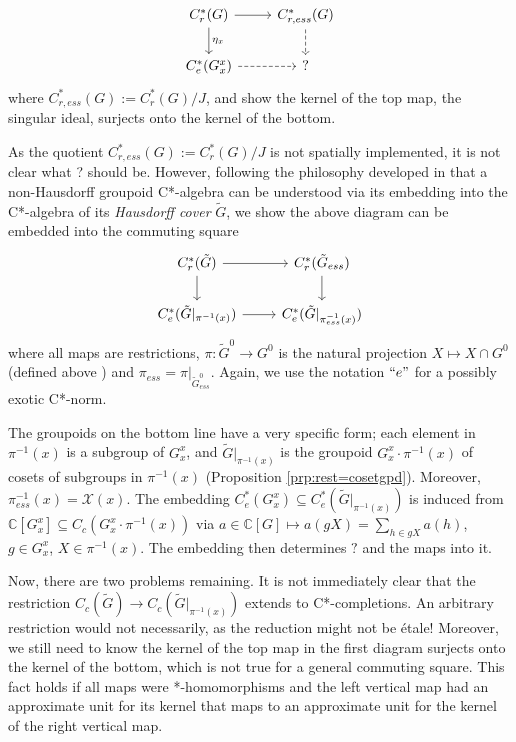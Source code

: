\documentclass[a4paper, 12pt]{amsart}
\theoremstyle{definition}
\theoremstyle{remark}
\numberwithin{equation}{section}
\begin{document}
$$\begin{tikzcd}
C^{*}_{r}(G) \arrow[r] \arrow[d, "\eta_{x}"] & {C^{*}_{r,ess}(G)} \arrow[d, dashed] \\
C^{*}_{e}(G^{x}_{x}) \arrow[r, dashed]       & ?                                 
\end{tikzcd}$$ where $C^{*}_{r,ess}(G):= C^{*}_{r}(G)/J$, and show the kernel of the top map, the singular ideal, surjects onto the kernel of the bottom.

As the quotient $C^{*}_{r,ess}(G):= C^{*}_{r}(G)/J$ is not spatially implemented, it is not clear what ? should be. However, following the philosophy developed in \cite{BGHL25} that a non-Hausdorff groupoid C*-algebra can be understood via its embedding into the C*-algebra of its \emph{Hausdorff cover} $\tilde{G}$, we show the above diagram can be embedded into the commuting square
$$
\begin{tikzcd}
C^{*}_{r}(\tilde{G}) \arrow[r] \arrow[d] & C^{*}_{r}(\tilde{G}_{ess}) \arrow[d]   \\
C^{*}_{e}(\tilde{G}|_{\pi^{-1}(x)}) \arrow[r]                & C^{*}_{e}(\tilde{G}|_{\pi^{-1}_{ess}(x)})
\end{tikzcd}$$ where all maps are restrictions, $\pi:\tilde{G}^{0}\to G^{0}$ is the natural projection $X\mapsto X\cap G^{0}$ (defined above \cite[Lemma~3.5]{BGHL25}) and $\pi_{ess} = \pi|_{\tilde{G}^{0}_{ess}}$. Again, we use the notation $``e"$ for a possibly exotic C*-norm. 

The groupoids on the bottom line have a very specific form; each element in $\pi^{-1}(x)$ is a subgroup of $G^{x}_{x}$, and $\tilde{G}|_{\pi^{-1}(x)}$ is the groupoid $G^{x}_{x}\cdot\pi^{-1}(x)$ of cosets of subgroups in $\pi^{-1}(x)$ (Proposition \ref{prp:rest=cosetgpd}). Moreover, $\pi^{-1}_{ess}(x) = \mathcal{X}(x)$. The embedding $C^{*}_{e}(G^{x}_{x})\subseteq C^{*}_{e}(\tilde{G}|_{\pi^{-1}(x)})$ is induced from $\mathbb{C}[G^{x}_{x}]\subseteq C_{c}(G^{x}_{x}\cdot\pi^{-1}(x))$ via $a\in\mathbb{C}[G]\mapsto a(gX) = \sum_{h\in gX}a(h)$, $g\in G^{x}_{x}$, $X\in \pi^{-1}(x)$. The embedding then determines $?$ and the maps into it.

Now, there are two problems remaining. It is not immediately clear that the restriction $C_{c}(\tilde{G})\to C_{c}(\tilde{G}|_{\pi^{-1}(x)})$ extends to C*-completions. An arbitrary restriction would not necessarily, as the reduction might not be \'etale! Moreover, we still need to know the kernel of the top map in the first diagram surjects onto the kernel of the bottom, which is not true for a general commuting square. This fact holds if all maps were *-homomorphisms and the left vertical map had an approximate unit for its kernel that maps to an approximate unit for the kernel of the right vertical map.
\end{document}
